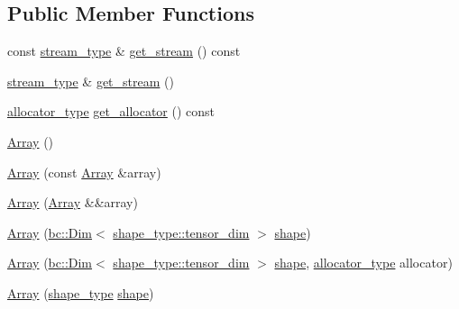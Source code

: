 \subsection*{Public Member Functions}
\begin{DoxyCompactItemize}
\item 
const \hyperlink{structbc_1_1tensors_1_1exprs_1_1Array_aba97273ba94fb140763e7db5da630ea0}{stream\+\_\+type} \& \hyperlink{structbc_1_1tensors_1_1exprs_1_1Array_a1d6e547e956f8f7bbd2a94ad10bd64fa}{get\+\_\+stream} () const
\item 
\hyperlink{structbc_1_1tensors_1_1exprs_1_1Array_aba97273ba94fb140763e7db5da630ea0}{stream\+\_\+type} \& \hyperlink{structbc_1_1tensors_1_1exprs_1_1Array_adde068372455f066865b2395634f407b}{get\+\_\+stream} ()
\item 
\hyperlink{structbc_1_1tensors_1_1exprs_1_1Array_a990afcebe8817075d427f2653d197140}{allocator\+\_\+type} \hyperlink{structbc_1_1tensors_1_1exprs_1_1Array_a23512d49fbc3734005e92d64ad31a3f8}{get\+\_\+allocator} () const
\item 
\hyperlink{structbc_1_1tensors_1_1exprs_1_1Array_aee4d34e0da545cb3463a2359a2daf6d4}{Array} ()
\item 
\hyperlink{structbc_1_1tensors_1_1exprs_1_1Array_a404b48bf95a86c8cb6978a3bf0107ffe}{Array} (const \hyperlink{structbc_1_1tensors_1_1exprs_1_1Array}{Array} \&array)
\item 
\hyperlink{structbc_1_1tensors_1_1exprs_1_1Array_a36469db9812dc419d20e87171a019998}{Array} (\hyperlink{structbc_1_1tensors_1_1exprs_1_1Array}{Array} \&\&array)
\item 
\hyperlink{structbc_1_1tensors_1_1exprs_1_1Array_a86801946a99e3d104ee7d6569c97072c}{Array} (\hyperlink{structbc_1_1Dim}{bc\+::\+Dim}$<$ \hyperlink{structbc_1_1Shape_a1f75fffa8b4aec4405025de308adb169}{shape\+\_\+type\+::tensor\+\_\+dim} $>$ \hyperlink{namespacebc_a1bc6dec532973ac024c738c0fd32cca3}{shape})
\item 
\hyperlink{structbc_1_1tensors_1_1exprs_1_1Array_afdc66d4d061f95a91831044776e619a3}{Array} (\hyperlink{structbc_1_1Dim}{bc\+::\+Dim}$<$ \hyperlink{structbc_1_1Shape_a1f75fffa8b4aec4405025de308adb169}{shape\+\_\+type\+::tensor\+\_\+dim} $>$ \hyperlink{namespacebc_a1bc6dec532973ac024c738c0fd32cca3}{shape}, \hyperlink{structbc_1_1tensors_1_1exprs_1_1Array_a990afcebe8817075d427f2653d197140}{allocator\+\_\+type} allocator)
\item 
\hyperlink{structbc_1_1tensors_1_1exprs_1_1Array_a5fa294dbb5d9eccea7201c507c6f7004}{Array} (\hyperlink{structbc_1_1tensors_1_1exprs_1_1Array_a67c96ea64a2899ba0593a6b81aa0868e}{shape\+\_\+type} \hyperlink{namespacebc_a1bc6dec532973ac024c738c0fd32cca3}{shape})

\end{DoxyCompactItemize}
